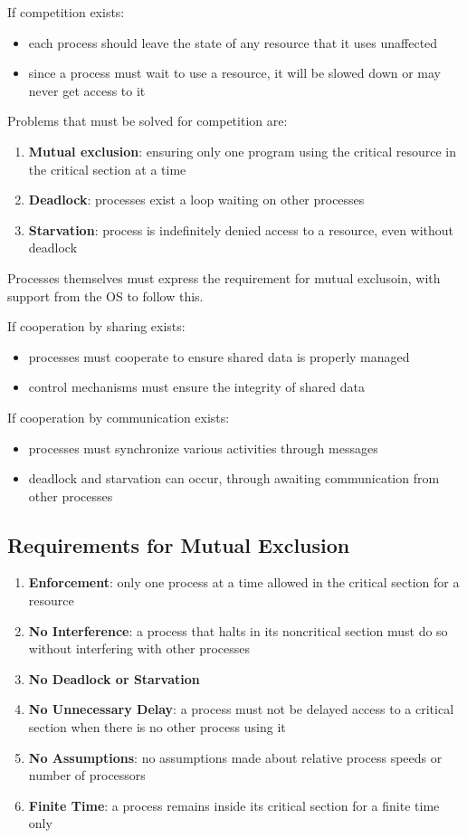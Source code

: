 \documentclass[11pt]{article}
\begin{document}
If competition exists:
\begin{itemize}
\item each process should leave the state of any resource that
it uses unaffected
\item since a process must wait to use a resource, it will be
slowed down or may never get access to it
\end{itemize}

Problems that must be solved for competition are:
\begin{enumerate}
\item \textbf{Mutual exclusion}: ensuring only one program using the critical
resource in the critical section at a time
\item \textbf{Deadlock}: processes exist a loop waiting on other processes
\item \textbf{Starvation}: process is indefinitely denied access to a
resource, even without deadlock
\end{enumerate}

Processes themselves must express the requirement for mutual exclusoin,
with support from the OS to follow this.

If cooperation by sharing exists:
\begin{itemize}
\item processes must cooperate to ensure shared data is properly managed
\item control mechanisms must ensure the integrity of shared data
\end{itemize}

If cooperation by communication exists:
\begin{itemize}
\item processes must synchronize various activities through messages
\item deadlock and starvation can occur, through awaiting communication
from other processes
\end{itemize}
\subsection{Requirements for Mutual Exclusion}
\label{sec:orgd1c0458}
\begin{enumerate}
\item \textbf{Enforcement}: only one process at a time allowed in the
critical section for a resource
\item \textbf{No Interference}: a process that halts in its noncritical section
must do so without interfering with other processes
\item \textbf{No Deadlock or Starvation}
\item \textbf{No Unnecessary Delay}: a process must not be delayed access to a
critical section when there is no other process using it
\item \textbf{No Assumptions}: no assumptions made about relative process
speeds or number of processors
\item \textbf{Finite Time}: a process remains inside its critical section
for a finite time only
\end{enumerate}
\end{document}
